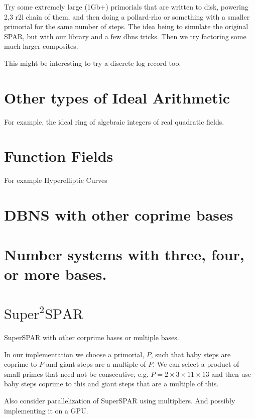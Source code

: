 \documentclass{ucalgthes1}
\theoremstyle{definition}
\begin{document}
Try some extremely large (1Gb+) primorials that are written to disk, powering 2,3 r2l chain of them, and then doing a pollard-rho or something with a smaller primorial for the same number of steps.  The idea being to simulate the original SPAR, but with our library and a few dbns tricks.  Then we try factoring some much larger composites.

This might be interesting to try a discrete log record too.

\section{Other types of Ideal Arithmetic}
For example, the ideal ring of algebraic integers of real quadratic fields.

\section{Function Fields}

For example Hyperelliptic Curves

\section{DBNS with other coprime bases}

\section{Number systems with three, four, or more bases.}

\section{$\textrm{Super}^2\textrm{SPAR}$}

SuperSPAR with other corprime bases or multiple bases.

In our implementation we choose a primorial, $P$, such that baby steps are coprime to $P$ and giant steps are a multiple of $P$.  We can select a product of small primes that need not be consecutive, e.g. $P = 2 \times 3 \times 11 \times 13$ and then use baby steps coprime to this and giant steps that are a multiple of this.

Also consider parallelization of SuperSPAR using multipliers.  And possibly implementing it on a GPU.




\end{document}
